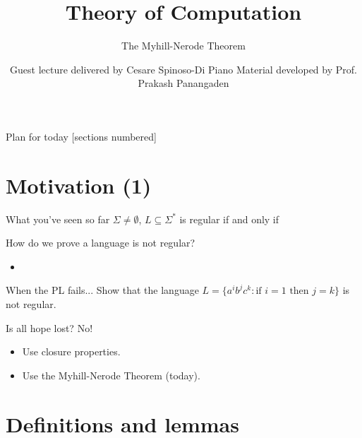 \documentclass[10pt]{beamer}
\title{Theory of Computation}
\subtitle{The Myhill-Nerode Theorem}
\date{}
\author{Guest lecture delivered by Cesare Spinoso-Di Piano \newline Material developed by Prof. Prakash Panangaden}
\begin{document}
\maketitle

\begin{frame}{Plan for today}
    [sections numbered]
    \tableofcontents[hideallsubsections]
\end{frame}

\section{Motivation (1)}

\begin{frame}[t]{What you've seen so far}
    $\Sigma \neq \emptyset$, $L \subseteq \Sigma^*$ is regular if and only if

\end{frame}

\begin{frame}{How do we prove a language is not regular?}
    \begin{itemize}
        \item
    \end{itemize}
\end{frame}

\begin{frame}[t]{When the PL fails...}
    Show that the language $L = \{a^ib^jc^k : \text{if } i = 1 \text{ then } j = k\}$ is not regular.
\end{frame}

\begin{frame}[t]{Is all hope lost?}
    No!
    \begin{itemize}
        \setlength\itemsep{7em}
        \item Use closure properties.
        \item Use the Myhill-Nerode Theorem (today).
    \end{itemize}
\end{frame}

\section{Definitions and lemmas}
\end{document}
